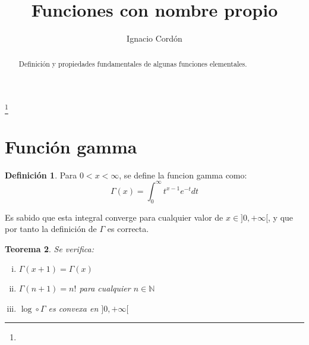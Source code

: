 \documentclass[a4paper, 11pt]{amsart}
\newtheorem{theorem}{Teorema}[section]
\theoremstyle{definition}
\newtheorem{definition}[theorem]{Definición}
\theoremstyle{remark}
\numberwithin{equation}{section}
\begin{document}
\title{Funciones con nombre propio}


\author{Ignacio Cordón}
\address{}
\curraddr{}
\email{}
\thanks{}


\keywords{}

\date{}

\dedicatory{}


\begin{abstract}
  Definición y propiedades fundamentales de algunas funciones elementales.
\end{abstract}

\maketitle

  \section{Función gamma}
  
  \begin{definition}
  Para $0 < x < \infty$, se define la funcion gamma como: 
    \begin{equation}
      \Gamma(x) = \int_0^{\infty}{t^{x-1}e^{-t}dt}
      \label{gamma}
    \end{equation}
  \end{definition}
  
  Es sabido que esta integral converge para cualquier valor de $x\in]0,+\infty[$, y que por tanto la definición de 
  $\Gamma$ es correcta.\\
  
  \begin{theorem}
    Se verifica:
      \begin{enumerate}[i.]
	\item $\Gamma(x+1) = \Gamma(x)$
	\item $\Gamma(n+1) = n!$ para cualquier $n\in \mathbb{N}$
	\item $\log \circ \Gamma$ es convexa en $]0,+\infty[$
      \end{enumerate}
  \end{theorem}
  
\end{document}
